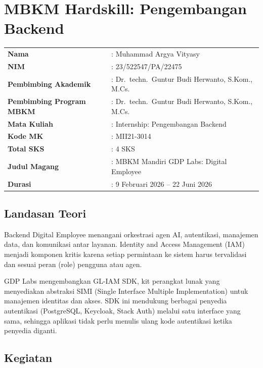 \section{MBKM Hardskill: Pengembangan Backend}

\begin{table}[H]
    \centering
    \begin{tabular}{ll}
        \textbf{Nama} & : Muhammad Argya Vityasy \\
        \textbf{NIM} & : 23/522547/PA/22475 \\
        \textbf{Pembimbing Akademik} & : Dr.\ techn.\ Guntur Budi Herwanto, S.Kom., M.Cs. \\
        \textbf{Pembimbing Program MBKM} & : Dr.\ techn.\ Guntur Budi Herwanto, S.Kom., M.Cs. \\
        \textbf{Mata Kuliah} & : Internship: Pengembangan Backend \\
        \textbf{Kode MK} & : MII21-3014 \\
        \textbf{Total SKS} & : 4 SKS \\
        \textbf{Judul Magang} & : MBKM Mandiri GDP Labs: Digital Employee \\
        \textbf{Durasi} & : 9 Februari 2026 -- 22 Juni 2026 \\
    \end{tabular}
\end{table}

\subsection{Landasan Teori}

Backend Digital Employee menangani orkestrasi agen AI, autentikasi, manajemen data, dan komunikasi antar layanan. Identity and Access Management (IAM) menjadi komponen kritis karena setiap permintaan ke sistem harus tervalidasi dan sesuai peran (role) pengguna atau agen.

GDP Labs mengembangkan GL-IAM SDK, kit perangkat lunak yang menyediakan abstraksi SIMI (Single Interface Multiple Implementation) untuk manajemen identitas dan akses. SDK ini mendukung berbagai penyedia autentikasi (PostgreSQL, Keycloak, Stack Auth) melalui satu interface yang sama, sehingga aplikasi tidak perlu menulis ulang kode autentikasi ketika penyedia diganti.

\subsection{Kegiatan}

